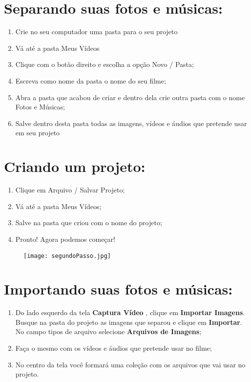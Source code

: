 \documentclass{article}
\begin{document}
\newpage

\section{Separando suas fotos e músicas:}
\begin{enumerate}
\item Crie no seu computador uma pasta para o seu projeto
\item Vá até a pasta Meus Vídeos
\item Clique com o botão direito e escolha a opção Novo / Pasta;
\item Escreva como nome da pasta o nome do seu filme;
\item Abra a pasta que acabou de criar e dentro dela crie outra pasta com o nome Fotos e Músicas;
\item Salve dentro desta pasta todas as imagens, vídeos e áudios que pretende usar em seu projeto
\end{enumerate}

\section{Criando um projeto:}
\begin{enumerate}
\item Clique em Arquivo / Salvar Projeto;
\item Vá até a pasta Meus Vídeos;
\item Salve na pasta que criou com o nome do projeto;
\item Pronto! Agora podemos começar!
\end{enumerate}

\begin{figure}[h!]
\centering
\texttt{[image: segundoPasso.jpg]}
\end{figure}

\newpage

\section{Importando suas fotos e músicas:}
\begin{enumerate}
\item Do lado esquerdo da tela \textbf{Captura Vídeo} , clique em \textbf{Importar Imagens}. Busque na pasta do projeto as imagens que separou e clique em \textbf{Importar}. No campo tipos de arquivo selecione \textbf{Arquivos de Imagens};
\item Faça o mesmo com os vídeos e áudios que pretende usar no filme;
\item No centro da tela você formará uma coleção com os arquivos que vai usar no projeto.
\end{enumerate}
\end{document}
